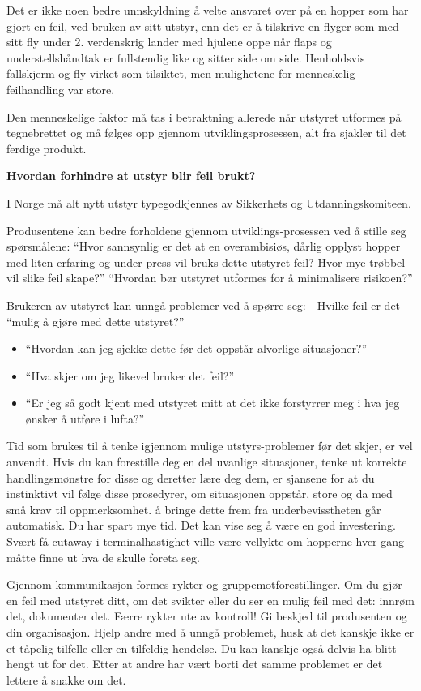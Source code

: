 Det er ikke noen bedre unnskyldning å velte ansvaret over på en hopper som har gjort en feil, ved bruken av sitt utstyr, enn det er å tilskrive en flyger som med sitt fly under 2. verdenskrig lander med hjulene oppe når flaps og understellshåndtak er fullstendig like og sitter side om side. Henholdsvis fallskjerm og fly virket som tilsiktet, men mulighetene for menneskelig feilhandling var store.

Den menneskelige faktor må tas i betraktning allerede når utstyret utformes på tegnebrettet og må følges opp gjennom utviklingsprosessen, alt fra sjakler til det ferdige produkt.

\textbf{Hvordan forhindre at utstyr blir feil brukt?}

I Norge må alt nytt utstyr typegodkjennes av Sikkerhets og Utdanningskomiteen.

Produsentene kan bedre forholdene gjennom utviklings-prosessen ved å stille seg spørsmålene: ``Hvor sannsynlig er det at en overambisiøs, dårlig opplyst hopper med liten erfaring og under press vil bruks dette utstyret feil? Hvor mye trøbbel vil slike feil skape?'' ``Hvordan bør utstyret utformes for å minimalisere risikoen?''

Brukeren av utstyret kan unngå problemer ved å spørre seg: - Hvilke feil er det ``mulig å gjøre med dette utstyret?''

\begin{itemize}
	\item ``Hvordan kan jeg sjekke dette før det oppstår alvorlige situasjoner?''
	\item ``Hva skjer om jeg likevel bruker det feil?''
	\item ``Er jeg så godt kjent med utstyret mitt at det ikke forstyrrer meg i hva jeg ønsker å utføre i lufta?''
\end{itemize}

Tid som brukes til å tenke igjennom mulige utstyrs-problemer før det skjer, er vel anvendt. Hvis du kan forestille deg en del uvanlige situasjoner, tenke ut korrekte handlingsmønstre for disse og deretter lære deg dem, er sjansene for at du instinktivt vil følge disse prosedyrer, om situasjonen oppstår, store og da med små krav til oppmerksomhet. å bringe dette frem fra underbevisstheten går automatisk. Du har spart mye tid. Det kan vise seg å være en god investering. Svært få cutaway i terminalhastighet ville være vellykte om hopperne hver gang måtte finne ut hva de skulle foreta seg.

Gjennom kommunikasjon formes rykter og gruppemotforestillinger. Om du gjør en feil med utstyret ditt, om det svikter eller du ser en mulig feil med det: innrøm det, dokumenter det. Færre rykter ute av kontroll! Gi beskjed til produsenten og din organisasjon. Hjelp andre med å unngå problemet, husk at det kanskje ikke er et tåpelig tilfelle eller en tilfeldig hendelse. Du kan kanskje også delvis ha blitt hengt ut for det. Etter at andre har vært borti det samme problemet er det lettere å snakke om det.

